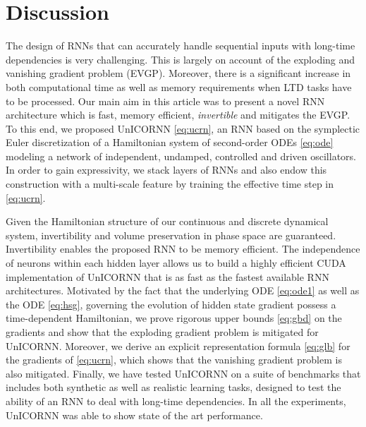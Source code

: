 \documentclass[a4paper]{article}
\begin{document}
\section{Discussion}
The design of RNNs that can accurately handle sequential inputs with long-time dependencies is very challenging. This is largely on account of the exploding and vanishing gradient problem (EVGP). Moreover, there is a significant increase in both computational time as well as memory requirements when LTD tasks have to be processed. Our main aim in this article was to present a novel RNN architecture which is fast, memory efficient, \emph{invertible} and mitigates the EVGP. To this end, we proposed UnICORNN \eqref{eq:ucrn}, an RNN based on the symplectic Euler discretization of a Hamiltonian system of second-order ODEs \eqref{eq:ode} modeling a network of independent, undamped, controlled and driven oscillators. In order to gain expressivity, we stack layers of RNNs and also endow this construction with a multi-scale feature by training the effective time step in \eqref{eq:ucrn}. 

Given the Hamiltonian structure of our continuous and discrete dynamical system, invertibility and volume preservation in phase space are guaranteed. Invertibility enables the proposed RNN to be memory efficient. The independence of neurons within each hidden layer allows us to build a highly efficient CUDA implementation of UnICORNN that is as fast as the fastest available RNN architectures. Motivated by the fact that the underlying ODE \eqref{eq:ode1} as well as the ODE \eqref{eq:hsg}, governing the evolution of hidden state gradient possess a time-dependent Hamiltonian, we prove rigorous upper bounds \eqref{eq:gbd} on the gradients and show that the exploding gradient problem is mitigated for UnICORNN. Moreover, we derive an explicit representation formula \eqref{eq:glb} for the gradients of \eqref{eq:ucrn}, which shows that the vanishing gradient problem is also mitigated. Finally, we have tested UnICORNN on a suite of benchmarks that includes both synthetic as well as realistic learning tasks, designed to test the ability of an RNN to deal with long-time dependencies. In all the experiments, UnICORNN was able to show state of the art performance. 
\end{document}
